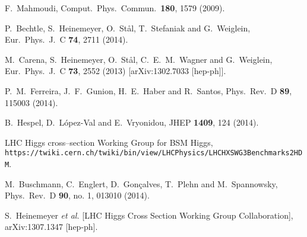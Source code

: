   F.~Mahmoudi,
  Comput.\ Phys.\ Commun.\  {\bf 180}, 1579 (2009).

  P.~Bechtle, S.~Heinemeyer, O.~St{\aa}l, T.~Stefaniak and G.~Weiglein,
  Eur.\ Phys.\ J.\ C {\bf 74}, 2711 (2014).

  M.~Carena, S.~Heinemeyer, O.~St{\aa}l, C.~E.~M.~Wagner and G.~Weiglein,
  Eur.\ Phys.\ J.\ C {\bf 73}, 2552 (2013)
  [arXiv:1302.7033 [hep-ph]].

  P.~M.~Ferreira, J.~F.~Gunion, H.~E.~Haber and R.~Santos,
  Phys.\ Rev.\ D {\bf 89}, 115003 (2014).

  B.~Hespel, D.~L\'opez-Val and E.~Vryonidou,
  JHEP {\bf 1409}, 124 (2014).  
  
 LHC Higgs cross--section Working Group for BSM Higgs, \\
  \texttt{https://twiki.cern.ch/twiki/bin/view/LHCPhysics/LHCHXSWG3Benchmarks2HDM}.

  M.~Buschmann, C.~Englert, D.~Gon\c{c}alves, T.~Plehn and M.~Spannowsky,
  Phys.\ Rev.\ D {\bf 90}, no. 1, 013010 (2014).

  S.~Heinemeyer {\it et al.} [LHC Higgs Cross Section Working Group Collaboration],
  arXiv:1307.1347 [hep-ph].

